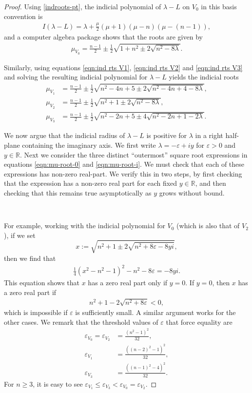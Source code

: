 \documentclass[10pt,reqno]{amsart}
\newcommand{\bR}{\mathbb{R}}
\newcommand{\vep}{\varepsilon}
\begin{document}
\begin{proof}
Using \eqref{indroots-pt}, the indicial polynomial of $\lambda - L$ on $V_0$ in this basis convention is
\begin{align*}
I( \lambda - L ) = \lambda+\frac{\mu}{2}(\mu+1)(\mu-n)(\mu-(n-1)),
\end{align*}
and a computer algebra package shows that the roots are given by
\begin{align} \label{eqn:mu-root-0}
\mu_{V_0} = \frac{n-1}{2} \pm \frac{1}{2}\sqrt{ 1 + n^2 \pm 2 \sqrt{n^2 - 8 \lambda}}.
\end{align}

Similarly, using equations \eqref{eqn:ind rts V1}, \eqref{eqn:ind rts V2} and \eqref{eqn:ind rts V3} and solving the resulting indicial polynomial for $\lambda - L$ yields the indicial roots 
\begin{align} \label{eqn:mu-root-i}
\mu_{V_1} &= \frac{n-1}{2} \pm \frac{1}{2}\sqrt{ n^2 - 4n + 5 \pm 2 \sqrt{n^2 - 4n + 4 - 8 \lambda}}, \nonumber \\
\mu_{V_2} &= \frac{n-1}{2} \pm \frac{1}{2}\sqrt{ n^2 +1  \pm 2 \sqrt{n^2 - 8 \lambda}},  \\
\mu_{V_3} &= \frac{n-1}{2} \pm \frac{1}{2}\sqrt{ n^2 -2n + 5  \pm 4 \sqrt{n^2 -2n +1 -2 \lambda}} \nonumber.
\end{align}

We now argue that the indicial radius of $\lambda - L$ is positive for $\lambda$ in a right half-plane containing the imaginary axis.  We first write $\lambda = -\vep + i y$ for $\vep > 0$ and $y \in \bR$.  Next we consider the three distinct ``outermost'' square root expressions in equations \eqref{eqn:mu-root-0} and \eqref{eqn:mu-root-i}.  We must check that each of these expressions has non-zero real-part.  We verify this in two steps, by first checking that the expression has a non-zero real part for each fixed $y \in \bR$, and then checking that this remains true asymptotically as $y$ grows without bound.

\


For example, working with the indicial polynomial for $V_0$ (which is also that of $V_2$), if we set \[x :=\sqrt{ n^2+1 \pm 2\sqrt{n^2 +8 \vep - 8 y i}},\] then we find that 
\begin{align*}
\frac{1}{4} (x^2 - n^2 - 1)^2 - n^2 - 8 \vep = -8 y i. 
\end{align*}
This equation shows that $x$ has a zero real part only if $y=0$.  If $y=0$, then $x$ has a zero real part if 
\begin{align*}
n^2 + 1 - 2\sqrt{n^2 + 8 \vep} < 0,
\end{align*}
which is impossible if $\vep$ is sufficiently small.  A similar argument works for the other cases.  We remark that the threshold values of $\vep$ that force equality are 
\begin{align*}
\vep_{V_0} = \vep_{V_2} &= \frac{(n^2 - 1)^2}{32}, \\
\vep_{V_1} &= \frac{((n-2)^2 - 1)^2}{32}, \\
\vep_{V_3} &= \frac{((n-1)^2 - 4)^2}{32}.
\end{align*}
For $n\geq 3$, it is easy to see $\vep_{V_1} \leq \vep_{V_3} < \vep_{V_0}=\vep_{V_2}$.


\end{proof}
\end{document}
